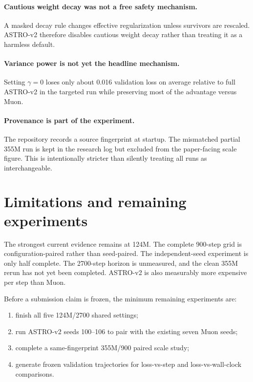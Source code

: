 \documentclass[10pt,twocolumn]{article}
\begin{document}
\paragraph{Cautious weight decay was not a free safety mechanism.}
A masked decay rule changes effective regularization unless survivors are
rescaled. ASTRO-v2 therefore disables cautious weight decay rather than treating
it as a harmless default.

\paragraph{Variance power is not yet the headline mechanism.}
Setting $\gamma=0$ loses only about 0.016 validation loss on average relative to
full ASTRO-v2 in the targeted run while preserving most of the advantage versus
Muon.

\paragraph{Provenance is part of the experiment.}
The repository records a source fingerprint at startup. The mismatched partial
355M run is kept in the research log but excluded from the paper-facing scale
figure. This is intentionally stricter than silently treating all runs as
interchangeable.

\section{Limitations and remaining experiments}
The strongest current evidence remains at 124M. The complete 900-step grid is
configuration-paired rather than seed-paired. The independent-seed experiment is
only half complete. The 2700-step horizon is unmeasured, and the clean 355M
rerun has not yet been completed. ASTRO-v2 is also measurably more expensive per
step than Muon.

Before a submission claim is frozen, the minimum remaining experiments are:
\begin{enumerate}
  \item finish all five 124M/2700 shared settings;
  \item run ASTRO-v2 seeds 100--106 to pair with the existing seven Muon seeds;
  \item complete a same-fingerprint 355M/900 paired scale study;
  \item generate frozen validation trajectories for loss-vs-step and
  loss-vs-wall-clock comparisons.
\end{enumerate}
\end{document}
